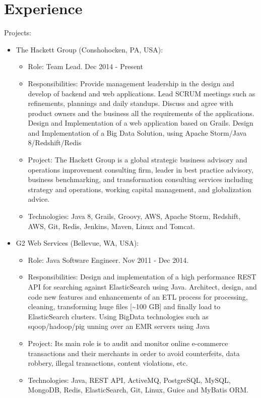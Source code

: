 \documentclass[11pt,a4paper,sans]{moderncv}        %
\begin{document}
\section{Experience}
  {
    Projects:\\
    \begin{itemize}
      \item The Hackett Group (Conshohocken, PA, USA):
        \begin{itemize}
          \item Role: Team Lead. Dec 2014 - Present
          \item Responsibilities: Provide management leadership in the design and develop of backend and web applications. Lead SCRUM meetings such as refinements, plannings and daily standups.
		Discuss and agree with product owners and the business all the requirements of the applications. Design and Implementation of a web application based on Grails.
		Design and Implementation of a Big Data Solution, using Apache Storm/Java 8/Redshift/Redis
          \item Project: The Hackett Group is a global strategic business advisory and operations improvement consulting firm, leader in best practice advisory, business benchmarking, 
                and transformation consulting services including strategy and operations, working capital management, and globalization advice.
          \item Technologies: Java 8, Grails, Groovy, AWS, Apache Storm, Redshift, AWS, Git, Redis, Jenkins, Maven, Linux and Tomcat.
        \end{itemize}
      \item G2 Web Services (Bellevue, WA, USA):
        \begin{itemize}
          \item Role: Java Software Engineer. Nov 2011 - Dec 2014.
          \item Responsibilities: Design and implementation of a high performance REST API for searching against ElasticSearch using Java.
                Architect, design, and code new features and enhancements of an ETL process for processing, cleaning, transforming huge files [\textasciitilde{}100 GB] and finally load to ElasticSearch clusters. Using BigData technologies such as sqoop/hadoop/pig unning over an EMR servers using Java
          \item Project: Its main role is to audit and monitor online e-commerce transactions and their merchants in order to avoid counterfeits, data robbery, illegal transactions, content violations, etc.
          \item Technologies: Java, REST API, ActiveMQ, PostgreSQL, MySQL, MongoDB, Redis, ElasticSearch, Git, Linux, Guice and MyBatis ORM.
        \end{itemize}
    \end{itemize}
  }
\end{document}
